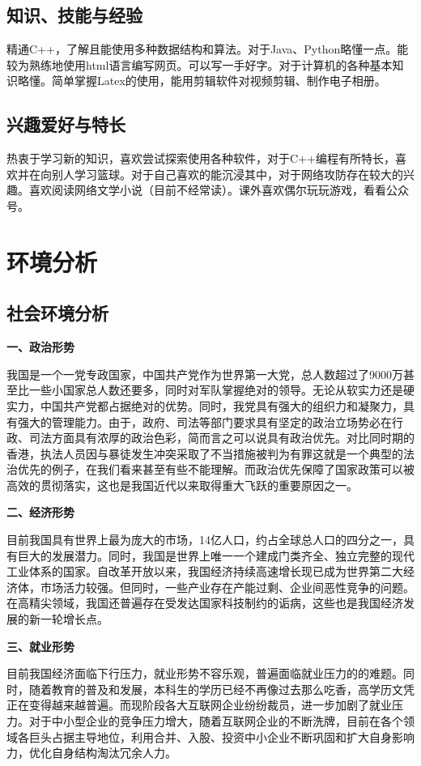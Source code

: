 \documentclass{article}
\begin{document}
\subsection{知识、技能与经验}
	精通C++，了解且能使用多种数据结构和算法。对于Java、Python略懂一点。能较为熟练地使用html语言编写网页。可以写一手好字。对于计算机的各种基本知识略懂。简单掌握Latex的使用，能用剪辑软件对视频剪辑、制作电子相册。\par
\subsection{兴趣爱好与特长}
	热衷于学习新的知识，喜欢尝试探索使用各种软件，对于C++编程有所特长，喜欢并在向别人学习篮球。对于自己喜欢的能沉浸其中，对于网络攻防存在较大的兴趣。喜欢阅读网络文学小说（目前不经常读）。课外喜欢偶尔玩玩游戏，看看公众号。\par
\section{环境分析}
\subsection{社会环境分析}
	\noindent\textbf{一、政治形势}\par
	我国是一个一党专政国家，中国共产党作为世界第一大党，总人数超过了9000万甚至比一些小国家总人数还要多，同时对军队掌握绝对的领导。无论从软实力还是硬实力，中国共产党都占据绝对的优势。同时，我党具有强大的组织力和凝聚力，具有强大的管理能力。由于，政府、司法等部门要求具有坚定的政治立场势必在行政、司法方面具有浓厚的政治色彩，简而言之可以说具有政治优先。对比同时期的香港，执法人员因与暴徒发生冲突采取了不当措施被判为有罪这就是一个典型的法治优先的例子，在我们看来甚至有些不能理解。而政治优先保障了国家政策可以被高效的贯彻落实，这也是我国近代以来取得重大飞跃的重要原因之一。\par
	\noindent\textbf{二、经济形势}\par
	目前我国具有世界上最为庞大的市场，14亿人口，约占全球总人口的四分之一，具有巨大的发展潜力。同时，我国是世界上唯一一个建成门类齐全、独立完整的现代工业体系的国家。自改革开放以来，我国经济持续高速增长现已成为世界第二大经济体，市场活力较强。但同时，一些产业存在产能过剩、企业间恶性竞争的问题。在高精尖领域，我国还普遍存在受发达国家科技制约的诟病，这些也是我国经济发展的新一轮增长点。\par
	\noindent\textbf{三、就业形势}\par
	目前我国经济面临下行压力，就业形势不容乐观，普遍面临就业压力的的难题。同时，随着教育的普及和发展，本科生的学历已经不再像过去那么吃香，高学历文凭正在变得越来越普遍。而现阶段各大互联网企业纷纷裁员，进一步加剧了就业压力。对于中小型企业的竞争压力增大，随着互联网企业的不断洗牌，目前在各个领域各巨头占据主导地位，利用合并、入股、投资中小企业不断巩固和扩大自身影响力，优化自身结构淘汰冗余人力。\par
\end{document}
